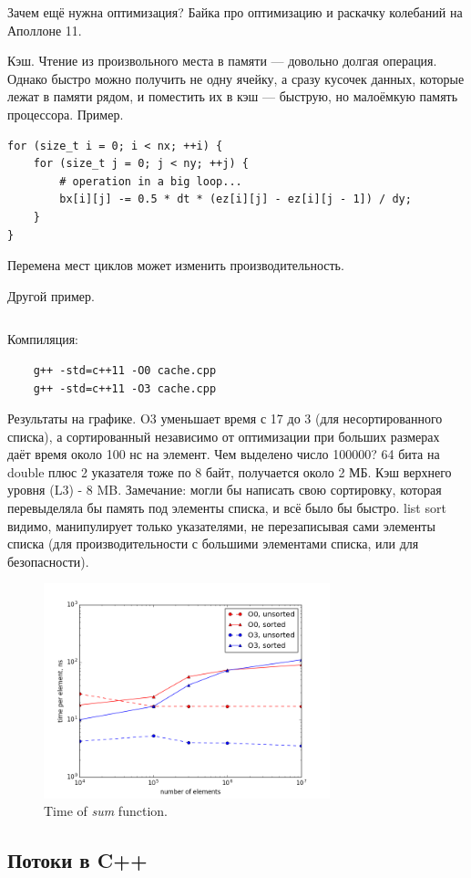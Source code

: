 \documentclass{book}
\begin{document}
Зачем ещё нужна оптимизация? Байка про оптимизацию и раскачку колебаний на Аполлоне 11.

Кэш. Чтение из произвольного места в памяти --- довольно долгая операция. Однако быстро можно
получить не одну ячейку, а сразу кусочек данных, которые лежат в памяти рядом, и поместить их в кэш
--- быструю, но малоёмкую память процессора. Пример.
\begin{verbatim}
for (size_t i = 0; i < nx; ++i) {
    for (size_t j = 0; j < ny; ++j) {
        # operation in a big loop...
        bx[i][j] -= 0.5 * dt * (ez[i][j] - ez[i][j - 1]) / dy;
    }
}
\end{verbatim}
Перемена мест циклов может изменить производительность.

Другой пример.
\inputminted{cpp}{cache.cpp}

Компиляция:
\begin{verbatim}
    g++ -std=c++11 -O0 cache.cpp
    g++ -std=c++11 -O3 cache.cpp
\end{verbatim}
Результаты на графике. O3 уменьшает время с 17 до 3 (для несортированного списка), а сортированный
независимо от оптимизации при больших размерах даёт время около 100 нс на элемент. Чем выделено
число 100000? 64 бита на double плюс 2 указателя тоже по 8 байт, получается около 2 МБ. Кэш верхнего
уровня (L3) - 8 MB. Замечание: могли бы написать свою сортировку, которая перевыделяла бы память
под элементы списка, и всё было бы быстро. list sort видимо, манипулирует только указателями, не
перезаписывая сами элементы списка (для производительности с большими элементами списка, или для
безопасности).
\begin{figure}[h]
  \centering
  \includegraphics[width=8.3cm]{cache.png}
    \caption{\label{fig:stereo}Time of {\it sum} function.}
\end{figure}

\subsection{Потоки в C++}
\end{document}
